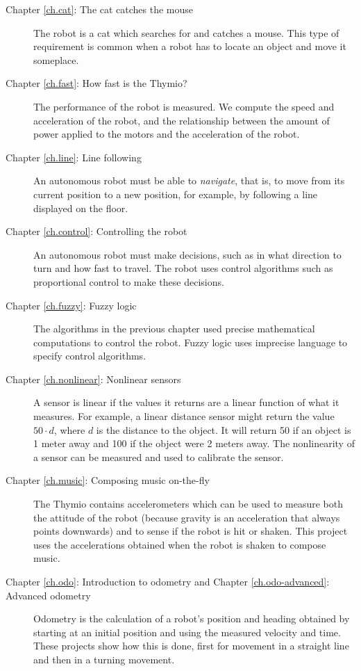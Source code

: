 \begin{description}

\item[Chapter \ref{ch.cat}: The cat catches the mouse] The robot is a
cat which searches for and catches a mouse. This type of requirement is
common when a robot has to locate an object and move it someplace.

\item[Chapter \ref{ch.fast}: How fast is the Thymio?] The
performance of the robot is measured. We compute the speed and
acceleration of the robot, and the relationship between the amount of
power applied to the motors and the acceleration of the robot.

\item[Chapter \ref{ch.line}: Line following] An autonomous robot must be
able to \emph{navigate}, that is, to move from its current position to a
new position, for example, by following a line displayed on the floor.

\item[Chapter \ref{ch.control}: Controlling the robot] An autonomous
robot must make decisions, such as in what direction to turn and how
fast to travel. The robot uses control algorithms such as proportional
control to make these decisions.

\item[Chapter \ref{ch.fuzzy}: Fuzzy logic] The algorithms in the
previous chapter used precise mathematical computations to control the
robot. Fuzzy logic uses imprecise language to specify control
algorithms.

\item[Chapter \ref{ch.nonlinear}: Nonlinear sensors] A sensor is linear
if the values it returns are a linear function of what it measures. For
example, a linear distance sensor might return the value $50\cdot d$,
where $d$ is the distance to the object. It will return 50 if an object
is 1 meter away and 100 if the object were 2 meters away. The
nonlinearity of a sensor can be measured and used to calibrate the
sensor.

\item[Chapter \ref{ch.music}: Composing music on-the-fly] The Thymio
contains accelerometers which can be used to measure both the
attitude of the robot (because gravity is an acceleration that always
points downwards) and to sense if the robot is hit or shaken. This
project uses the accelerations obtained when the robot is shaken to
compose music.

\item[Chapter \ref{ch.odo}: Introduction to odometry and Chapter
\ref{ch.odo-advanced}: Advanced odometry] Odometry is the calculation of
a robot's position and heading obtained by starting at an initial
position and using the measured velocity and time. These projects show
how this is done, first for movement in a straight line and then in a
turning movement.


\end{description}
